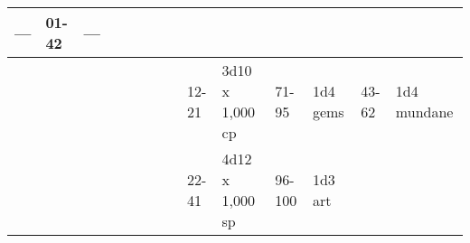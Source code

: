 \begin{longtable}{llllllllllllll}
{\begin{minipage}[t]{0.469in}
---\end{minipage}} & \multicolumn{1}{p{0.626in}|}{\begin{minipage}[t]{0.626in}\raggedright
01-42\end{minipage}} & \multicolumn{1}{p{0.469in}|}{\begin{minipage}[t]{0.469in}\centering
---\end{minipage}}\\
\hline
\multicolumn{8}{p{1.150in}|}{\begin{minipage}[t]{1.150in}\centering
\end{minipage}} & \multicolumn{1}{|p{0.393in}|}{\begin{minipage}[t]{0.393in}\raggedright
12-21\end{minipage}} & \multicolumn{1}{p{0.469in}|}{\begin{minipage}[t]{0.469in}\raggedright
3d10 x 1,000 cp\end{minipage}} & \multicolumn{1}{p{0.923in}|}{\begin{minipage}[t]{0.923in}\raggedright
71-95\end{minipage}} & \multicolumn{1}{p{0.469in}|}{\begin{minipage}[t]{0.469in}\raggedright
1d4 gems\end{minipage}} & \multicolumn{1}{p{0.626in}|}{\begin{minipage}[t]{0.626in}\raggedright
43-62\end{minipage}} & \multicolumn{1}{p{0.469in}|}{\begin{minipage}[t]{0.469in}\centering
1d4 mundane\end{minipage}}\\
\hline
\multicolumn{8}{p{1.150in}|}{\begin{minipage}[t]{1.150in}\centering
\end{minipage}} & \multicolumn{1}{|p{0.393in}|}{\begin{minipage}[t]{0.393in}\raggedright
22-41\end{minipage}} & \multicolumn{1}{p{0.469in}|}{\begin{minipage}[t]{0.469in}\raggedright
4d12 x 1,000 sp\end{minipage}} & \multicolumn{1}{p{0.923in}|}{\begin{minipage}[t]{0.923in}\raggedright
96-100\end{minipage}} & \multicolumn{1}{p{0.469in}|}{\begin{minipage}[t]{0.469in}\raggedright
1d3 art\end{minipage}} & \multicolumn{1}{p{0.626in}|}{\begin{minipage}[t]{0.626in}\raggedright

\end{minipage}}
\end{longtable}
